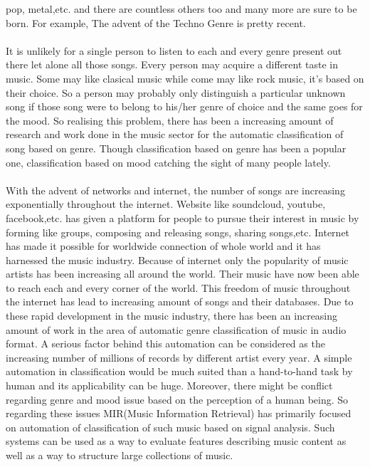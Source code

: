 pop, metal,etc. and there are countless others too and many more are sure to be born. For example, The advent of the Techno Genre is pretty recent.\\
\\
It is unlikely for a single person to listen to each and every genre present out there let alone all those songs. Every person may acquire a different taste 
in music. Some may like clasical music while come may like rock music, it's based on their choice. So a person may probably only distinguish a particular unknown song 
if those song were to belong to his/her genre of choice and the same goes for the mood. So realising this problem, there has been a increasing amount of research
and work done in the music sector for the automatic classification of song based on genre. Though classification based on genre has been a popular one,
classification based on mood catching the sight of many people lately.\\
\\
With the advent of networks and internet, the number of songs are increasing exponentially throughout the internet. Website like soundcloud, youtube, facebook,etc. 
has given a platform for people to pursue their interest in music by forming like groups, composing and releasing songs, sharing songs,etc.
Internet has made it possible for worldwide connection of whole world and it has harnessed the music industry. Because of internet only the
popularity of music artists has been increasing all around the world. Their music have now been able to reach each and every corner of the world.
This freedom of music throughout the internet has lead to increasing amount of songs and their databases.
Due to these rapid development in the music industry, there has been an increasing amount of work in the area of automatic genre classification
of music in audio format. A serious factor behind this automation can be considered as the increasing number of millions of records by different 
artist every year. A simple automation in classification would be much suited than a hand-to-hand task by human and its applicability can be huge.
Moreover, there might be conflict regarding genre and mood issue based on the perception of a human being. So regarding these
issues MIR(Music Information Retrieval) has primarily focused on automation of classification of such music based on signal analysis. Such systems
can be used as a way to evaluate features describing music content as well as a way to structure large collections of music.\\



